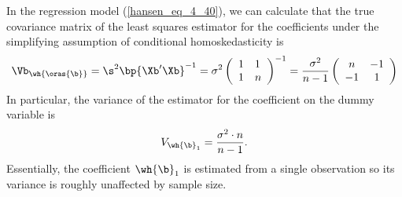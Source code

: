 In the regression model (\ref{hansen_eq_4_40}), we can calculate that the true covariance matrix of the least squares estimator for the coefficients under the simplifying assumption of conditional homoskedasticity is
\begin{equation}
    \notag 
    \Vb_{\wh{\oras{\b}}} = \s^2 \bp{\Xb^{\prime} \Xb}^{-1} = \sigma^2\left(\begin{array}{ll}
        1 & 1 \\
        1 & n
        \end{array}\right)^{-1}=\frac{\sigma^2}{n-1}\left(\begin{array}{cc}
        n & -1 \\
        -1 & 1
        \end{array}\right)
\end{equation}
In particular, the variance of the estimator for the coefficient on the dummy variable is 
\begin{equation}
    \notag 
    V_{\wh{\b}_1} = \frac{\sigma^2 \cdot n}{n-1}.
\end{equation}
Essentially, the coefficient $\wh{\b}_1$ is estimated from a single observation so its variance is roughly unaffected by sample size. 

